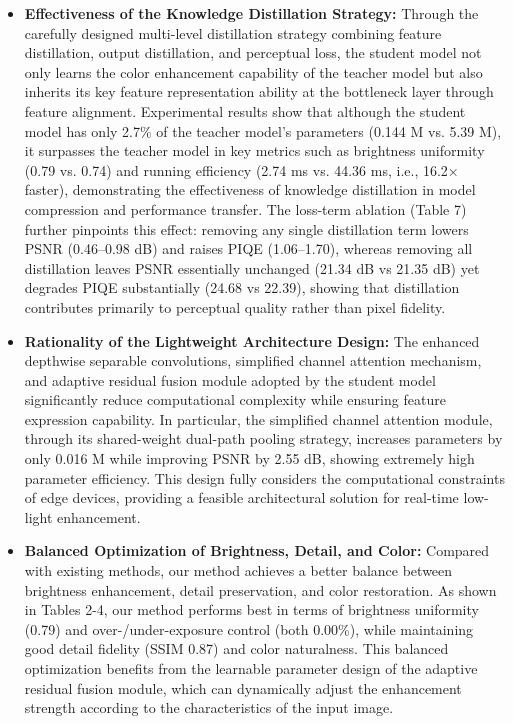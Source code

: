 \documentclass[sensors,article,submit,moreauthors]{Definitions/mdpi}
\begin{document}
\begin{itemize}
\item \textbf{Effectiveness of the Knowledge Distillation Strategy:} Through the carefully designed multi-level distillation strategy combining feature distillation, output distillation, and perceptual loss, the student model not only learns the color enhancement capability of the teacher model but also inherits its key feature representation ability at the bottleneck layer through feature alignment. Experimental results show that although the student model has only 2.7\% of the teacher model's parameters (0.144 M vs. 5.39 M), it surpasses the teacher model in key metrics such as brightness uniformity (0.79 vs. 0.74) and running efficiency (2.74 ms vs. 44.36 ms, i.e., 16.2$\times$ faster), demonstrating the effectiveness of knowledge distillation in model compression and performance transfer. The loss-term ablation (Table 7) further pinpoints this effect: removing any single distillation term lowers PSNR (0.46--0.98 dB) and raises PIQE (1.06--1.70), whereas removing all distillation leaves PSNR essentially unchanged (21.34 dB vs 21.35 dB) yet degrades PIQE substantially (24.68 vs 22.39), showing that distillation contributes primarily to perceptual quality rather than pixel fidelity.
\item \textbf{Rationality of the Lightweight Architecture Design:} The enhanced depthwise separable convolutions, simplified channel attention mechanism, and adaptive residual fusion module adopted by the student model significantly reduce computational complexity while ensuring feature expression capability. In particular, the simplified channel attention module, through its shared-weight dual-path pooling strategy, increases parameters by only 0.016 M while improving PSNR by 2.55 dB, showing extremely high parameter efficiency. This design fully considers the computational constraints of edge devices, providing a feasible architectural solution for real-time low-light enhancement.
\item \textbf{Balanced Optimization of Brightness, Detail, and Color:} Compared with existing methods, our method achieves a better balance between brightness enhancement, detail preservation, and color restoration. As shown in Tables 2-4, our method performs best in terms of brightness uniformity (0.79) and over-/under-exposure control (both 0.00\%), while maintaining good detail fidelity (SSIM 0.87) and color naturalness. This balanced optimization benefits from the learnable parameter design of the adaptive residual fusion module, which can dynamically adjust the enhancement strength according to the characteristics of the input image.
\end{itemize}
\end{document}
